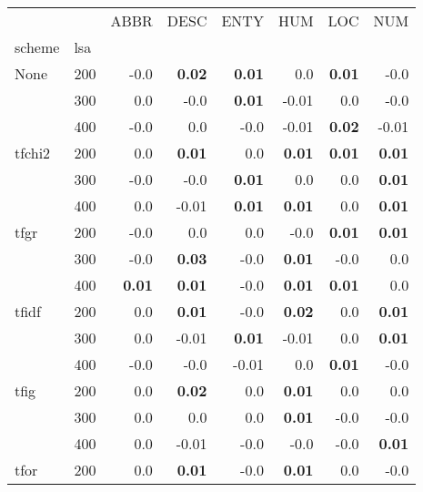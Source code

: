 \begin{table}[h]
\begin{center}

\begin{tabular}{ll|rrrrrr}
\toprule
   &   & ABBR & DESC & ENTY & HUM & LOC & NUM \\
scheme & lsa &         &         &         &         &         &         \\
\midrule
None & 200 &       -0.0 &  \textbf{0.02} &  \textbf{0.01} &       0.0 &  \textbf{0.01} &      -0.0 \\
   & 300 &       0.0 &       -0.0 &  \textbf{0.01} &      -0.01 &       0.0 &      -0.0 \\
   & 400 &       -0.0 &       0.0 &       -0.0 &      -0.01 &  \textbf{0.02} &      -0.01 \\
tfchi2 & 200 &       0.0 &  \textbf{0.01} &       0.0 &  \textbf{0.01} &  \textbf{0.01} &  \textbf{0.01} \\
   & 300 &       -0.0 &       -0.0 &  \textbf{0.01} &       0.0 &       0.0 &  \textbf{0.01} \\
   & 400 &       0.0 &      -0.01 &  \textbf{0.01} &  \textbf{0.01} &       0.0 &  \textbf{0.01} \\
tfgr & 200 &       -0.0 &       0.0 &       0.0 &      -0.0 &  \textbf{0.01} &  \textbf{0.01} \\
   & 300 &       -0.0 &  \textbf{0.03} &       -0.0 &  \textbf{0.01} &      -0.0 &       0.0 \\
   & 400 &  \textbf{0.01} &  \textbf{0.01} &       -0.0 &  \textbf{0.01} &  \textbf{0.01} &       0.0 \\
tfidf & 200 &       0.0 &  \textbf{0.01} &       -0.0 &  \textbf{0.02} &       0.0 &  \textbf{0.01} \\
   & 300 &       0.0 &      -0.01 &  \textbf{0.01} &      -0.01 &       0.0 &  \textbf{0.01} \\
   & 400 &       -0.0 &       -0.0 &      -0.01 &       0.0 &  \textbf{0.01} &      -0.0 \\
tfig & 200 &       0.0 &  \textbf{0.02} &       0.0 &  \textbf{0.01} &       0.0 &       0.0 \\
   & 300 &       0.0 &       0.0 &       0.0 &  \textbf{0.01} &      -0.0 &      -0.0 \\
   & 400 &       0.0 &      -0.01 &       -0.0 &      -0.0 &      -0.0 &  \textbf{0.01} \\
tfor & 200 &       0.0 &  \textbf{0.01} &       -0.0 &  \textbf{0.01} &       0.0 &      -0.0 \\

\end{tabular}
\end{center}
\end{table}

